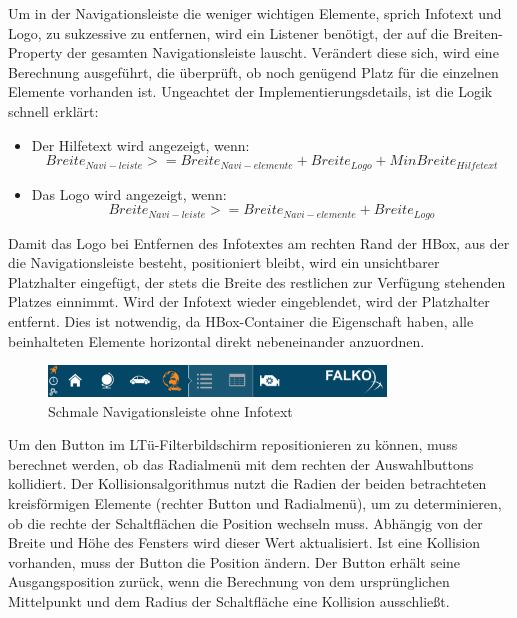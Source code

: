 Um in der Navigationsleiste die weniger wichtigen Elemente, sprich Infotext und Logo, zu sukzessive zu entfernen, wird ein Listener benötigt, der auf die Breiten-Property der gesamten Navigationsleiste lauscht. Verändert diese sich, wird eine Berechnung ausgeführt, die überprüft, ob noch genügend Platz für die einzelnen Elemente vorhanden ist. Ungeachtet der Implementierungsdetails, ist die Logik schnell erklärt:
\begin{itemize}
	\item Der Hilfetext wird angezeigt, wenn:
 		\begin{equation}
 			Breite_{Navi-leiste} >= Breite_{Navi-elemente} + Breite_{Logo} + MinBreite_{Hilfetext}
 		\end{equation}
 	\item Das Logo wird angezeigt, wenn:
 		\begin{equation}
	 		Breite_{Navi-leiste} >= Breite_{Navi-elemente} + Breite_{Logo}
 		\end{equation}
\end{itemize}
Damit das Logo bei Entfernen des Infotextes am rechten Rand der HBox, aus der die Navigationsleiste besteht, positioniert bleibt, wird ein unsichtbarer Platzhalter eingefügt, der stets die Breite des restlichen zur Verfügung stehenden Platzes einnimmt. Wird der Infotext wieder eingeblendet, wird der Platzhalter entfernt. Dies ist notwendig, da HBox-Container die Eigenschaft haben, alle beinhalteten Elemente horizontal direkt nebeneinander anzuordnen.\par
\begin{figure}[H]
 \centering
 \includegraphics[width=0.8\textwidth]{grafiken/fix_nav.png}
 \caption{Schmale Navigationsleiste ohne Infotext}
 \label{fig:fixNav}
\end{figure}
Um den Button im LTü-Filterbildschirm repositionieren zu können, muss berechnet werden, ob das Radialmenü mit dem rechten der Auswahlbuttons kollidiert. Der Kollisionsalgorithmus nutzt die Radien der beiden betrachteten kreisförmigen Elemente (rechter Button und Radialmenü), um zu determinieren, ob die rechte der Schaltflächen die Position wechseln muss. Abhängig von der Breite und Höhe des Fensters wird dieser Wert aktualisiert. Ist eine Kollision vorhanden, muss der Button die Position ändern. Der Button erhält seine Ausgangsposition zurück, wenn die Berechnung von dem ursprünglichen Mittelpunkt und dem Radius der Schaltfläche eine Kollision ausschließt.\par
